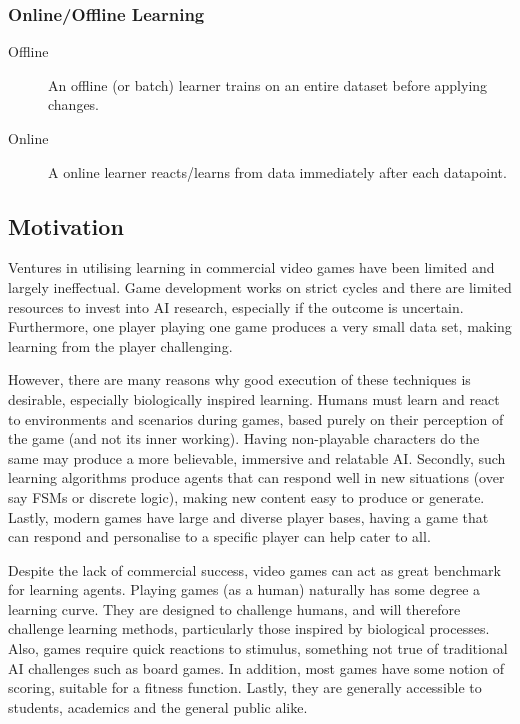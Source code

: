 \subsubsection{Online/Offline Learning}
\begin{description}
	\item[Offline] An offline (or batch) learner trains on an entire dataset before applying changes. 
	\item[Online] A online learner reacts/learns from data immediately after each datapoint.
\end{description} 


\subsection{Motivation}

Ventures in utilising learning in commercial video games have been limited and largely ineffectual. Game development works on strict cycles and there are limited resources to invest into AI research, especially if the outcome is uncertain. Furthermore, one player playing one game produces a very small data set, making learning from the player challenging. \cite{evolutioningamedesign}

However, there are many reasons why good execution of these techniques is desirable, especially biologically inspired learning. Humans must learn and react to environments and scenarios during games, based purely on their perception of the game (and not its inner working). Having non-playable characters do the same may produce a more believable, immersive and relatable AI. Secondly, such learning algorithms produce agents that can respond well in new situations (over say FSMs or discrete logic), making new content easy to produce or generate. Lastly, modern games have large and diverse player bases, having a game that can respond and personalise to a specific player can help cater to all. \cite[p.~7, p.~13]{panorama}

Despite the lack of commercial success, video games can act as great benchmark for learning agents. Playing games (as a human) naturally has some degree a learning curve. They are designed to challenge humans, and will therefore challenge learning methods, particularly those inspired by biological processes. Also, games require quick reactions to stimulus, something not true of traditional AI challenges such as board games. In addition, most games have some notion of scoring, suitable for a fitness function. Lastly, they are generally accessible to students, academics and the general public alike. \cite[p.~9]{panorama} \cite[p.~1]{marioaicomp} \cite[p.~2]{2012the}

